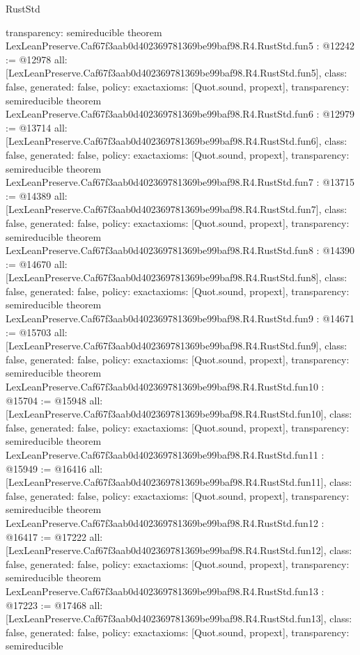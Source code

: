 \begin{lexlean}{RustStd}
\begin{coremodule}
{  transparency: semireducible
}
theorem LexLeanPreserve.Caf67f3aab0d402369781369be99baf98.R4.RustStd.fun5 : @12242 := @12978 {
  all: [LexLeanPreserve.Caf67f3aab0d402369781369be99baf98.R4.RustStd.fun5],
  class: false,
  generated: false,
  policy: exact{axioms: [Quot.sound, propext]},
  transparency: semireducible
}
theorem LexLeanPreserve.Caf67f3aab0d402369781369be99baf98.R4.RustStd.fun6 : @12979 := @13714 {
  all: [LexLeanPreserve.Caf67f3aab0d402369781369be99baf98.R4.RustStd.fun6],
  class: false,
  generated: false,
  policy: exact{axioms: [Quot.sound, propext]},
  transparency: semireducible
}
theorem LexLeanPreserve.Caf67f3aab0d402369781369be99baf98.R4.RustStd.fun7 : @13715 := @14389 {
  all: [LexLeanPreserve.Caf67f3aab0d402369781369be99baf98.R4.RustStd.fun7],
  class: false,
  generated: false,
  policy: exact{axioms: [Quot.sound, propext]},
  transparency: semireducible
}
theorem LexLeanPreserve.Caf67f3aab0d402369781369be99baf98.R4.RustStd.fun8 : @14390 := @14670 {
  all: [LexLeanPreserve.Caf67f3aab0d402369781369be99baf98.R4.RustStd.fun8],
  class: false,
  generated: false,
  policy: exact{axioms: [Quot.sound, propext]},
  transparency: semireducible
}
theorem LexLeanPreserve.Caf67f3aab0d402369781369be99baf98.R4.RustStd.fun9 : @14671 := @15703 {
  all: [LexLeanPreserve.Caf67f3aab0d402369781369be99baf98.R4.RustStd.fun9],
  class: false,
  generated: false,
  policy: exact{axioms: [Quot.sound, propext]},
  transparency: semireducible
}
theorem LexLeanPreserve.Caf67f3aab0d402369781369be99baf98.R4.RustStd.fun10 : @15704 := @15948 {
  all: [LexLeanPreserve.Caf67f3aab0d402369781369be99baf98.R4.RustStd.fun10],
  class: false,
  generated: false,
  policy: exact{axioms: [Quot.sound, propext]},
  transparency: semireducible
}
theorem LexLeanPreserve.Caf67f3aab0d402369781369be99baf98.R4.RustStd.fun11 : @15949 := @16416 {
  all: [LexLeanPreserve.Caf67f3aab0d402369781369be99baf98.R4.RustStd.fun11],
  class: false,
  generated: false,
  policy: exact{axioms: [Quot.sound, propext]},
  transparency: semireducible
}
theorem LexLeanPreserve.Caf67f3aab0d402369781369be99baf98.R4.RustStd.fun12 : @16417 := @17222 {
  all: [LexLeanPreserve.Caf67f3aab0d402369781369be99baf98.R4.RustStd.fun12],
  class: false,
  generated: false,
  policy: exact{axioms: [Quot.sound, propext]},
  transparency: semireducible
}
theorem LexLeanPreserve.Caf67f3aab0d402369781369be99baf98.R4.RustStd.fun13 : @17223 := @17468 {
  all: [LexLeanPreserve.Caf67f3aab0d402369781369be99baf98.R4.RustStd.fun13],
  class: false,
  generated: false,
  policy: exact{axioms: [Quot.sound, propext]},
  transparency: semireducible
}
\end{coremodule}
\end{lexlean}
